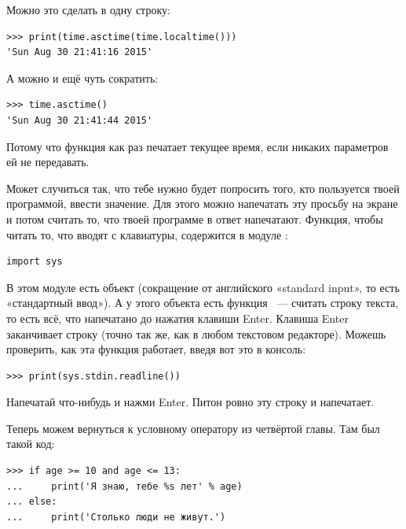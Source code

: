 Можно это сделать в одну строку:

\begin{listing}
\begin{verbatim}
>>> print(time.asctime(time.localtime()))
'Sun Aug 30 21:41:16 2015'
\end{verbatim}
\end{listing}

А можно и ещё чуть сократить:

\begin{listing}
\begin{verbatim}
>>> time.asctime()
'Sun Aug 30 21:41:44 2015'
\end{verbatim}
\end{listing}

Потому что функция  как раз печатает текущее время, если никаких параметров ей не передавать.

Может случиться так, что тебе нужно будет попросить того, кто пользуется твоей программой, ввести значение. Для этого можно напечатать эту просьбу на экране и потом считать то, что твоей программе в ответ напечатают. Функция, чтобы читать то, что вводят с клавиатуры, содержится в модуле :

\begin{listing}
\begin{verbatim}
import sys
\end{verbatim}
\end{listing}

В этом модуле есть объект  (сокращение от английского «standard input», то есть «стандартный ввод»). А у этого объекта есть функция  — считать строку текста, то есть всё, что напечатано до нажатия клавиши Enter. Клавиша Enter заканчивает строку (точно так же, как в любом текстовом редакторе). Можешь проверить, как эта функция работает, введя вот это в консоль:

\begin{listing}
\begin{verbatim}
>>> print(sys.stdin.readline())
\end{verbatim}
\end{listing}

Напечатай что-нибудь и нажми Enter. Питон ровно эту строку и напечатает.

Теперь можем вернуться к условному оператору  из четвёртой главы. Там был такой код:

\begin{listing}
\begin{verbatim}
>>> if age >= 10 and age <= 13:
...     print('Я знаю, тебе %s лет' % age)
... else:
...     print('Столько люди не живут.')
\end{verbatim}
\end{listing}

